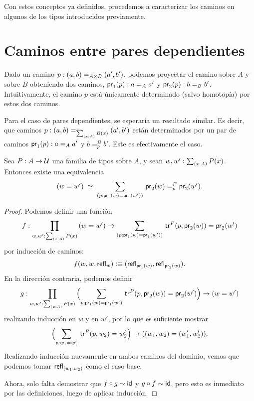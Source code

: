 \documentclass[../main.tex]{subfiles}
\begin{document}
Con estos conceptos ya definidos, procedemos a caracterizar los caminos en algunos de los tipos introducidos previamente.


\section{Caminos entre pares dependientes}
Dado un camino $p:\id[A\times B]{(a,b)}{(a',b')}$, podemos proyectar el camino sobre $A$ y sobre $B$ obteniendo dos caminos, $\ap{\proj1}p:\id[A]{a}{a'}$ y $\ap{\proj2}p:\id[B]{b}{b'}$.
Intuitivamente, el camino $p$ est\'a \'unicamente determinado (salvo homotop\'ia) por estos dos caminos.

Para el caso de pares dependientes, se esperar\'ia un resultado similar. Es decir, que caminos $p:\id[\sm{x:A}B(x)]{(a,b)}{(a',b')}$ est\'an determinados por un par de caminos $\fst(p):\id[A]{a}{a'}$ y $b=^B_p b'$.
Este es efectivamente el caso.

\begin{theorem}
  \label{sigma-char}
  Sea $P:A\to\type$ una familia de tipos sobre $A$, y sean $w,w':\sm{x:A}P(x)$. Entonces existe una equivalencia
  \begin{equation*}
    \eqvspaced{(w=w')}{\dsm{p:\proj{1}(w)=\proj{1}(w')} \snd(w)=^P_p\snd(w')}.
  \end{equation*}
\end{theorem}
\begin{proof}
  Podemos definir una función
  \begin{equation*}
    f : \prd{w,w':\sm{x:A}P(x)} (w=w') \to \dsm{p:\proj{1}(w)=\proj{1}(w')} \trfib{P}{p}{\proj{2}(w)}=\proj{2}(w')
  \end{equation*}
  por inducción de caminos:
  \begin{equation*}
    f(w,w,\refl{w})\defeq(\refl{\proj{1}(w)},\refl{\proj{2}(w)}).
  \end{equation*}
  En la direcci\'on contraria, podemos definir
  \begin{equation*}
    g : \prd{w,w':\sm{x:A}P(x)}
    \Parens{\sm{p:\proj{1}(w)=\proj{1}(w')}\trfib{P}{p}{\proj{2}(w)}=\proj{2}(w')}
    \to
    (w=w')
  \end{equation*}
  realizando inducci\'on en $w$ y en $w'$, por lo que es suficiente mostrar
  \begin{equation*}
    \Parens{\sm{p:w_1 = w_1'}\trfib{P}{p}{w_2}=w_2'} \to ((w_1,w_2)=(w_1',w_2')).
  \end{equation*}
  Realizando inducción nuevamente en ambos caminos del dominio, vemos que podemos tomar $\refl{(w_1,w_2)}$ como el caso base.

  Ahora, solo falta demostrar que $f \circ g \htpy \mathsf{id}$ y $g \circ f \htpy \mathsf{id}$, pero esto es inmediato por las definiciones, luego de aplicar inducción.
\end{proof}
\end{document}
